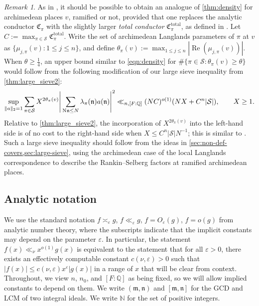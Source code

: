 \documentclass[11pt]{amsart}
\theoremstyle{remark}
\newtheorem*{remark}{Remark}
\numberwithin{equation}{section}
\newcommand{\m}{\mathfrak{m}}
\newcommand{\n}{\mathfrak{n}}
\newcommand{\kn}{\mathfrak{n}}
\newcommand{\N}{\textnormal{N}}
\newcommand{\Q}{\mathbb{Q}}
\newcommand{\mS}{\mathcal{S}}
\renewcommand{\Re}{\textnormal{Re}}
\newcommand{\eps}{\varepsilon}
\renewcommand{\Re}{\mathop{\mathrm{Re}}}
\renewcommand{\epsilon}{\varepsilon}
\begin{document}
\begin{remark}
As in \cite{lichtman2024density}, it should be possible to obtain an analogue of \cref{thm:density} for archimedean places $v$, ramified or not, provided that one replaces the analytic conductor $\mathfrak{C}_{\pi}$ with the slightly larger \emph{total conductor} $\mathfrak{C}_{\pi}^{\mathrm{total}}$, as defined in \cite[(3.10)]{lichtman2024density}.  Let $C :=\max_{\pi\in\mathcal{S}}\mathfrak{C}_{\pi}^{\mathrm{total}}$.  Write the set of archimedean Langlands parameters of $\pi$ at $v$ as $\{\mu_{j,\pi}(v)\colon 1\leq j\leq n\}$, and define $\theta_\pi(v) := \max_{1\le j \le n} |\Re(\mu_{j,\pi}(v))|$. When $\theta \ge \tfrac{1}{4}$, an upper bound similar to \eqref{eqn:density} for $\#\{\pi \in \mS : \theta_{\pi}(v) \ge \theta\}$ would follow from the following modification of our large sieve inequality from \cref{thm:large_sieve2}:
\[
\sup_{\|a\|_2 = 1} \sum_{\pi \in \mS} X^{2\theta_{\pi}(v)} \Bigg| \sum_{\N\n \le N} \lambda_\pi(\kn) a(\kn) \Bigg|^2 \ll_{n,[F:\Q]} (NC)^{o(1)} (NX + C^n |\mS|),\qquad X\geq 1.
\]
Relative to \cref{thm:large_sieve2}, the incorporation of $X^{2\theta_{\pi}(v)}$ into the left-hand side is of no cost to the right-hand side when $X \le C^n|\mS| N^{-1}$; this is similar to \cite[Theorems 5 and 6]{deshouillers1982kloosterman}. Such a large sieve inequality should follow from the ideas in \cref{sec:non-def-covers,sec:large-sieve}, using the archimedean case of the local Langlands correspondence to describe the Rankin--Selberg factors at ramified archimedean places.
\end{remark}

\subsection*{Analytic notation}
\label{subsec:notation}
We use the standard notation $f \asymp_\eps g$, $f \ll_\eps g$, $f = O_\eps(g)$, $f = o(g)$ from analytic number theory, where the subscripts indicate that the implicit constants may depend on the parameter $\eps$.  In particular, the statement $f(x) \ll_{\nu} x^{o(1)} g(x)$ is equivalent to the statement that for all $\epsilon>0$, there exists an effectively computable constant $c(\nu,\epsilon)>0$ such that $|f(x)| \leq c(\nu,\epsilon) x^\eps |g(x)|$ in a range of $x$ that will be clear from context.  Throughout, we view $n$, $n_0$, and $[F:\Q]$ as being fixed, so we will allow implied constants to depend on them. We write $(\m, \n)$ and $[\m, \n]$ for the GCD and LCM of two integral ideals.  We write $\mathbb{N}$ for the set of positive integers.
\end{document}
